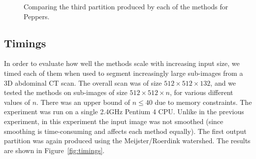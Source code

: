 \documentclass[preprint,a4paper]{elsarticle}
\newenvironment{stusubfig}[1]
{
	\begin{figure}[#1]
	\begin{center}
}
{
	\end{center}
	\end{figure}
}
\begin{document}
\begin{stusubfig}{p}
	\hspace{4mm}%
	\hspace{4mm}%
\caption[]{Comparing the third partition produced by each of the methods for Peppers.}
\label{fig:results-peppers}
\end{stusubfig}

\subsection{Timings}

In order to evaluate how well the methods scale with increasing input size, we timed each of them when used to segment increasingly large sub-images from a 3D abdominal CT scan\footnotemark{}. The overall scan was of size $512 \times 512 \times 132$, and we tested the methods on sub-images of size $512 \times 512 \times n$, for various different values of $n$. There was an upper bound of $n \le 40$ due to memory constraints. The experiment was run on a single 2.4GHz Pentium 4 CPU. Unlike in the previous experiment, in this experiment the input image was not smoothed (since smoothing is time-consuming and affects each method equally). The first output partition was again produced using the Meijster/Roerdink watershed. The results are shown in Figure~\ref{fig:timings}.
\end{document}
